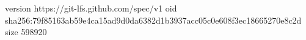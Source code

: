 version https://git-lfs.github.com/spec/v1
oid sha256:79f85163ab59e4ca15ad9d0da6382d1b3937acc05c0e608f3ec18665270e8c2d
size 598920
